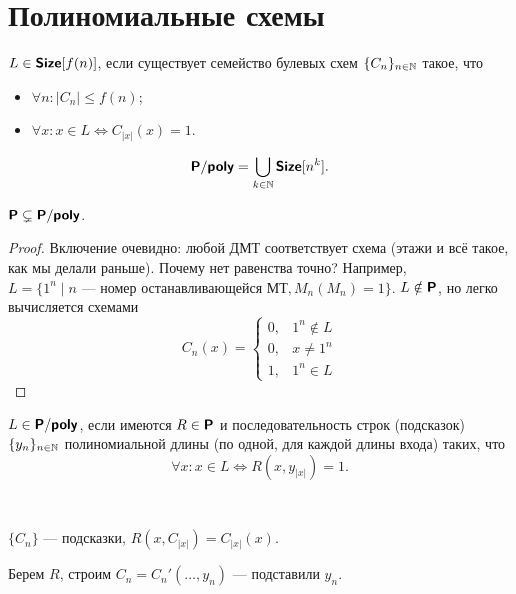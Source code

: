 \section{Полиномиальные схемы}
\begin{defn}[\Size]\index{\Size}
	$ L \in \Size[f(n)]$, если существует семейство булевых схем $ \{C_n\}_{n \in \N}$ такое, что
	\begin{itemize}[noitemsep]
		\item $ \forall n\colon \lvert C_n \rvert \le f(n)$;
		\item $ \forall x \colon x \in L \Longleftrightarrow C_{\lvert x \rvert }(x) = 1$.
	\end{itemize}
\end{defn}
\begin{defn}\index{\Ppoly}
    \[
		\Ppoly = \bigcup_{k \in \N} \Size[n^{k}]
    .\] 
\end{defn}
\begin{st}
    $ \P \subsetneq \Ppoly$.
\end{st}
\begin{proof}
    Включение очевидно: любой ДМТ соответствует схема (этажи и всё такое, как мы делали раньше).
	Почему нет равенства точно? Например, $ L = \{1^{n} \mid n \text{ --- номер останавливающейся МТ}, M_n(M_n) = 1\}$. $ L \notin \P$, но легко вычисляется схемами 
	\[
		C_{n}(x) = 
		\begin{cases}
			0, &1^{n} \notin L\\
			0, &x \ne 1^{n}\\
			1, &1^{n} \in L
		\end{cases}
	\] 
\end{proof}
\begin{defn}\index{\Size}
	$ L \in \Ppoly$, если имеются $ R \in \P$ и последовательность строк (подсказок) $ \{y_{n}\}_{n \in \N}$ полиномиальной длины (по одной, для каждой длины входа) таких, что
	\[
		\forall x\colon x \in L \Longleftrightarrow R(x, y_{\lvert x \rvert }) = 1
	.\] 
\end{defn}
\begin{note}
	~\begin{description}[noitemsep]
	    \item {} 
	$ \{C_n\}$ --- подсказки, $ R(x, C_{\lvert x \rvert }) = C_{\lvert x \rvert }(x)$.
	    \item {} 
			Берем $ R$, строим $ C_n = C_n' (\ldots, y_n) $ --- подставили $ y_n$.
	\end{description} 
\end{note}


